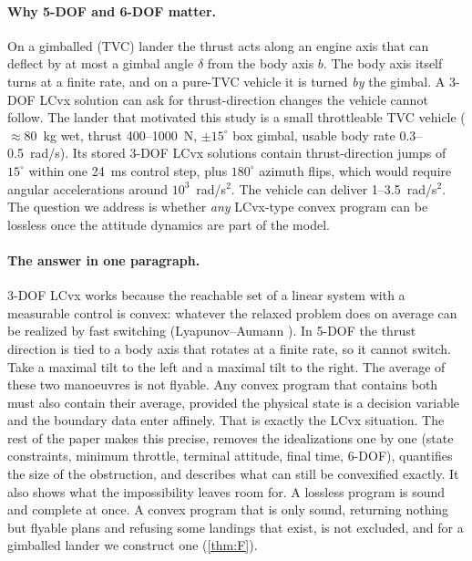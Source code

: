 \paragraph{Why 5-DOF and 6-DOF matter.}
On a gimballed (TVC) lander the thrust acts along an engine axis that can deflect by at most a gimbal angle $\delta$ from
the body axis $b$. The body axis itself turns at a finite rate, and on a pure-TVC vehicle it is turned \emph{by} the
gimbal. A 3-DOF LCvx solution can ask for thrust-direction changes the vehicle cannot follow. The lander that
motivated this study is a small throttleable TVC vehicle ($\approx 80$~kg wet, thrust 400--1000~N, $\pm15^\circ$
box gimbal, usable body rate 0.3--0.5~rad/s). Its stored 3-DOF LCvx solutions contain thrust-direction jumps of
$15^\circ$ within one 24~ms control step, plus $180^\circ$ azimuth flips, which would require angular accelerations
around $10^3$~rad/s$^2$. The vehicle can deliver 1--3.5~rad/s$^2$. The question we address is whether \emph{any}
LCvx-type convex program can be lossless once the attitude dynamics are part of the model.

\paragraph{The answer in one paragraph.}
3-DOF LCvx works because the reachable set of a linear system with a measurable control is convex: whatever the
relaxed problem does on average can be realized by fast switching (Lyapunov--Aumann \cite{lyapunov1940,aumann1965}).
In 5-DOF the thrust direction is tied to a body axis that rotates at a finite rate, so it cannot switch. Take a maximal
tilt to the left and a maximal tilt to the right. The average of these two manoeuvres is not flyable. Any convex
program that contains both must also contain their average, provided the physical state is a decision variable and
the boundary data enter affinely. That is exactly the LCvx situation. The rest of the paper makes this precise,
removes the idealizations one by one (state constraints, minimum throttle, terminal attitude, final time, 6-DOF),
quantifies the size of the obstruction, and describes what can still be convexified exactly. It also shows what the impossibility
leaves room for. A lossless program is sound and complete at once. A convex program that is only sound, returning nothing but
flyable plans and refusing some landings that exist, is not excluded, and for a gimballed lander we construct one (\cref{thm:F}).

